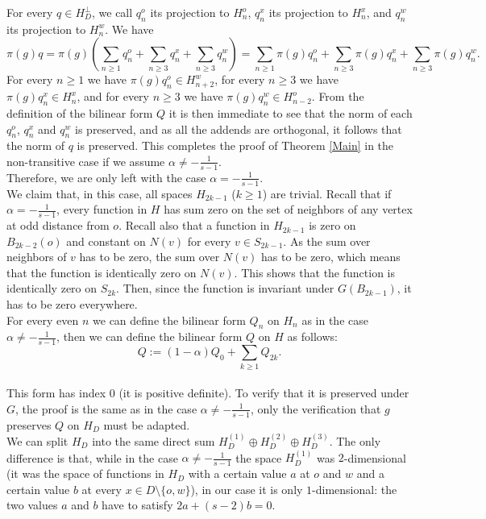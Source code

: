 \documentclass{article}
\theoremstyle{definition}
\theoremstyle{remark}
\theoremstyle{plain}
\begin{document}
For every $q\in H_D^\perp$, we call $q_n^o$ its projection to $H_n^o$, $q_n^x$ its projection to $H_n^x$, and $q_n^w$ its projection to $H_n^w$. We have $$\pi(g)q=\pi(g)\left(\sum_{n\geq 1}{q_n^o}+\sum_{n\geq 3}{q_n^x}+\sum_{n\geq 3}{q_n^w}\right)=\sum_{n\geq 1}{\pi(g)q_n^o}+\sum_{n\geq 3}{\pi(g)q_n^x}+\sum_{n\geq 3}{\pi(g)q_n^w}.$$ For every $n\geq 1$ we have $\pi(g)q_n^o\in H_{n+2}^w$, for every $n\geq 3$ we have $\pi(g)q_n^x\in H_n^x$, and for every $n\geq 3$ we have $\pi(g)q_n^w\in H_{n-2}^o$. From the definition of the bilinear form $Q$ it is then immediate to see that the norm of each $q_n^o$, $q_n^x$ and $q_n^w$ is preserved, and as all the addends are orthogonal, it follows that the norm of $q$ is preserved. This completes the proof of Theorem \ref{Main} in the non-transitive case if we assume $\alpha\neq -\frac{1}{s-1}$. \\

Therefore, we are only left with the case $\alpha=-\frac{1}{s-1}$. \\

We claim that, in this case, all spaces $H_{2k-1}$ ($k\geq 1$) are trivial. Recall that if $\alpha=-\frac{1}{s-1}$, every function in $H$ has sum zero on the set of neighbors of any vertex at odd distance from $o$. Recall also that a function in $H_{2k-1}$ is zero on $B_{2k-2}(o)$ and constant on $N(v)$ for every $v\in S_{2k-1}$. As the sum over neighbors of $v$ has to be zero, the sum over $N(v)$ has to be zero, which means that the function is identically zero on $N(v)$. This shows that the function is identically zero on $S_{2k}$. Then, since the function is invariant under $G(B_{2k-1})$, it has to be zero everywhere. \\

For every even $n$ we can define the bilinear form $Q_n$ on $H_n$ as in the case $\alpha\neq -\frac{1}{s-1}$, then we can define the bilinear form $Q$ on $H$ as follows: $$Q:=(1-\alpha)Q_0+\sum_{k\geq 1}{Q_{2k}}.$$ \\

This form has index $0$ (it is positive definite). To verify that it is preserved under $G$, the proof is the same as in the case $\alpha\neq -\frac{1}{s-1}$, only the verification that $g$ preserves $Q$ on $H_D$ must be adapted. \\

We can split $H_D$ into the same direct sum $H_D^{(1)}\oplus H_D^{(2)}\oplus H_D^{(3)}$. The only difference is that, while in the case $\alpha\neq -\frac{1}{s-1}$ the space $H_D^{(1)}$ was $2$-dimensional (it was the space of functions in $H_D$ with a certain value $a$ at $o$ and $w$ and a certain value $b$ at every $x\in D\setminus\{o,w\}$), in our case it is only $1$-dimensional: the two values $a$ and $b$ have to satisfy $2a+(s-2)b=0$. \\
\end{document}
